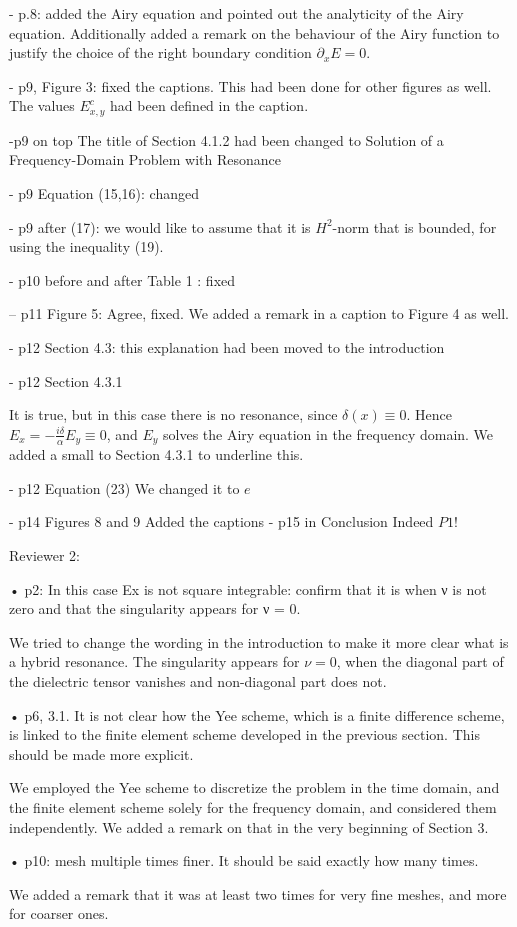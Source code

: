 \documentclass[a4paper,10pt]{article}
\begin{document}
 - p.8: added the Airy equation and pointed out the analyticity of the Airy equation. Additionally added a remark on the behaviour of the Airy function to justify the choice of the right boundary 
 condition $\partial_x E=0$. 
 
 -  p9, Figure 3: fixed the captions. This had been done for other figures as well. The values $E^{c}_{x,y}$ had been defined in the caption.
 
 -p9 on top
  The title of Section 4.1.2 had been changed to Solution of a Frequency-Domain Problem with Resonance
  
 - p9 Equation (15,16): changed  

 - p9 after (17): we would like to assume that it is $H^2$-norm that is bounded, for using the inequality (19). 
  
 - p10 before and after Table 1 : fixed
 
 -- p11 Figure 5:
Agree, fixed. We added a remark in a caption to Figure 4 as well.



- p12 Section 4.3: this explanation had been moved to the introduction



- p12 Section 4.3.1

  It is true, but in this case there is no resonance, since $\delta(x)\equiv 0$. Hence $E_x=-\frac{i\delta}{\alpha}E_y\equiv 0$, 
  and $E_y$ solves the Airy equation in the frequency domain. We added a small to Section 4.3.1 to underline this. 

  
- p12 Equation (23)
We changed it to $e$
  
- p14 Figures 8 and 9
Added the captions  
- p15 in Conclusion
  Indeed $P1$!
  

 Reviewer 2:
 
 • p2: In this case Ex is not square integrable: confirm that it is when ν is not zero and that
the singularity appears for ν = 0.

We tried to change the wording in the introduction to make it more clear what is a hybrid resonance. 
The singularity appears for $\nu=0$, when the diagonal part of the dielectric tensor vanishes and non-diagonal part does not. 

• p6, 3.1. It is not clear how the Yee scheme, which is a finite difference scheme, is linked to the
finite element scheme developed in the previous section. This should be made more explicit.

We employed the Yee scheme to discretize the problem in the time domain, and the finite element scheme solely for the frequency domain, 
and considered them independently. We added a remark on that in the very beginning of Section 3. 

• p10: mesh multiple times finer. It should be said exactly how many times. 

We added a remark that it was at least two times for very fine meshes, and more for coarser ones.


  
 
\end{document}
